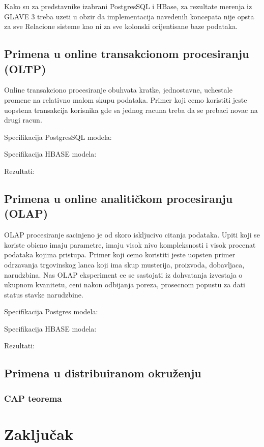\documentclass[12pt,oneside]{memoir}
\begin{document}
Kako su za predstavnike izabrani PostgresSQL i HBase,  za rezultate merenja iz GLAVE 3 treba uzeti u obzir da implementacija navedenih koncepata nije opsta za sve Relacione sisteme kao ni za sve kolonski orijentisane baze podataka.
\section{Primena u online transakcionom procesiranju (OLTP)}

Online transakciono procesiranje obuhvata kratke, jednostavne, uchestale promene  na relativno malom skupu podataka. Primer koji cemo koristiti jeste uopstena transakcija korisnika gde sa jednog racuna treba da se prebaci novac na drugi racun.

Specifikacija PostgresSQL modela:

Specifikacija HBASE modela:

Rezultati:

\section{Primena u online analitičkom procesiranju (OLAP)}

OLAP procesiranje sacinjeno je od skoro iskljucivo citanja podataka. Upiti koji se koriste obicno imaju parametre, imaju visok nivo kompleksnosti i visok procenat podataka kojima pristupa.
Primer koji cemo koristiti jeste uopsten primer odrzavanja trgovinskog lanca koji ima skup musterija, proizvoda, dobavljaca,  narudzbina. 
Nas OLAP eksperiment ce se sastojati iz dohvatanja izvestaja o ukupnom kvanitetu, ceni nakon odbijanja poreza, prosecnom popustu za dati status stavke narudzbine.


Specifikacija Postgres modela:

Specifikacija HBASE modela:

Rezultati:

\section{Primena u distribuiranom okruženju}
\subsection{CAP teorema}

\chapter{Zaključak}
\end{document}
